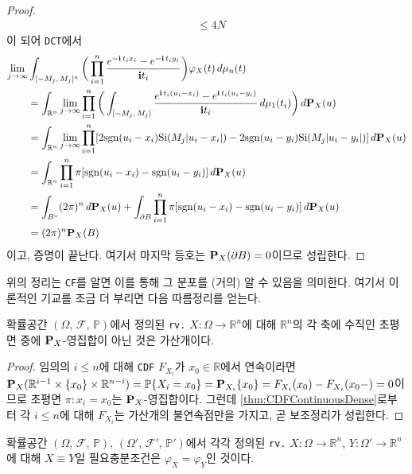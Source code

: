 \begin{proof}
\begin{align*}
        &\leq4N
    \end{align*}
    이 되어 \texttt{DCT}에서
    \begin{align*}
        \lim_{j\to\infty}&\int_{[-M_j,\,M_j]^n}\bigg(\prod_{i=1}^n\frac{e^{-\mathbf{i}\,t_ix_i}-e^{-\mathbf{i}\,t_iy_i}}{\mathbf{i} t_i}\bigg)\varphi_X(t)\,d\mu_n(t)\\
        &=\int_{\mathbb{R}^n}\lim_{j\to\infty}\prod_{i=1}^n\bigg(\int_{[-M_j,\,M_j]}\frac{e^{\mathbf{i}\,t_i(u_i-x_i)}-e^{\mathbf{i}\,t_i(u_i-y_i)}}{\mathbf{i} t_i}\,d\mu_1(t_i)\bigg)\,d\mathbf{P}_X(u)\\
        &=\int_{\mathbb{R}^n}\lim_{j\to\infty}\prod_{i=1}^n[2\mathrm{sgn}(u_i-x_i)\mathrm{Si}(M_j|u_i-x_i|)-2\mathrm{sgn}(u_i-y_i)\mathrm{Si}(M_j|u_i-y_i|)]\,d\mathbf{P}_X(u)\\
        &=\int_{\mathbb{R}^n}\prod_{i=1}^n\pi[\mathrm{sgn}(u_i-x_i)-\mathrm{sgn}(u_i-y_i)]\,d\mathbf{P}_X(u)\\
        &=\int_{B^\circ}(2\pi)^n\,d\mathbf{P}_X(u)+\int_{\partial B}\prod_{i=1}^n\pi[\mathrm{sgn}(u_i-x_i)-\mathrm{sgn}(u_i-y_i)]\,d\mathbf{P}_X(u)\\
        &=(2\pi)^n\mathbf{P}_X(B)
    \end{align*}
    이고, 증명이 끝난다. 여기서 마지막 등호는 $\mathbf{P}_X(\partial B)=0$이므로 성립한다.
\end{proof}

위의 정리는 \texttt{CF}를 알면 이를 통해 그 분포를 (거의) 알 수 있음을 의미한다. 여기서 이론적인 기교를 조금 더 부리면 다음 따름정리를 얻는다.

\begin{lemma}
    확률공간 $(\Omega,\,\mathcal{F},\,\mathbb{P})$에서 정의된 \texttt{rv.} $X:\Omega\to\mathbb{R}^n$에 대해 $\mathbb{R}^n$의 각 축에 수직인 초평면 중에 $\mathbf{P}_X$-영집합이 아닌 것은 가산개이다.
\end{lemma}

\begin{proof}
    임의의 $i\leq n$에 대해 \texttt{CDF} $F_{X_i}$가 $x_0\in\mathbb{R}$에서 연속이라면 $\mathbf{P}_X(\mathbb{R}^{i-1}\times\{x_0\}\times\mathbb{R}^{n-i})=\mathbb{P}\{X_i=x_0\}=\mathbf{P}_{X_i}\{x_0\}=F_{X_i}(x_0)-F_{X_i}(x_0-)=0$이므로 초평면 $\pi:x_i=x_0$는 $\mathbf{P}_X$-영집합이다. 그런데 \ref{thm:CDFContinuousDense}로부터 각 $i\leq n$에 대해 $F_{X_i}$는 가산개의 불연속점만을 가지고, 곧 보조정리가 성립한다.
\end{proof}

\begin{corollary}\label{cor:CFEquivalent}
    확률공간 $(\Omega,\,\mathcal{F},\,\mathbb{P}),\,(\Omega',\,\mathcal{F}',\,\mathbb{P}')$에서 각각 정의된 \texttt{rv.} $X:\Omega\to\mathbb{R}^n,\,Y:\Omega'\to\mathbb{R}^n$에 대해 $X\equiv Y$일 필요충분조건은 $\varphi_X=\varphi_Y$인 것이다.
\end{corollary}

